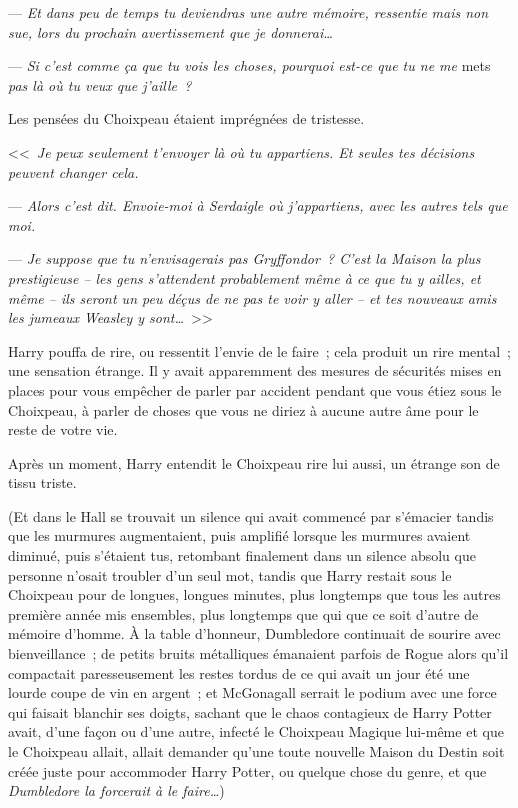 --- \emph{Et dans peu de temps tu deviendras une autre mémoire, ressentie mais non sue, lors du prochain avertissement que je donnerai…}

--- \emph{Si c'est comme ça que tu vois les choses, pourquoi est-ce que tu ne me} mets \emph{pas là où tu veux que j'aille~?}

Les pensées du Choixpeau étaient imprégnées de tristesse.

<<~\emph{Je peux seulement t'envoyer là où tu appartiens. Et seules tes décisions peuvent changer cela.}

--- \emph{Alors c'est dit. Envoie-moi à Serdaigle où j'appartiens, avec les autres tels que moi.}

--- \emph{Je suppose que tu n'envisagerais pas Gryffondor~? C'est la Maison la plus prestigieuse -- les gens s'attendent probablement même à ce que tu y ailles, et même -- ils seront un peu déçus de ne pas te voir y aller -- et tes nouveaux amis les jumeaux Weasley y sont…}~>>

Harry pouffa de rire, ou ressentit l'envie de le faire~; cela produit un rire mental~; une sensation étrange. Il y avait apparemment des mesures de sécurités mises en places pour vous empêcher de parler par accident pendant que vous étiez sous le Choixpeau, à parler de choses que vous ne diriez à aucune autre âme pour le reste de votre vie.

Après un moment, Harry entendit le Choixpeau rire lui aussi, un étrange son de tissu triste.

(Et dans le Hall se trouvait un silence qui avait commencé par s'émacier tandis que les murmures augmentaient, puis amplifié lorsque les murmures avaient diminué, puis s'étaient tus, retombant finalement dans un silence absolu que personne n'osait troubler d'un seul mot, tandis que Harry restait sous le Choixpeau pour de longues, longues minutes, plus longtemps que tous les autres première année mis ensembles, plus longtemps que qui que ce soit d'autre de mémoire d'homme. À la table d'honneur, Dumbledore continuait de sourire avec bienveillance~; de petits bruits métalliques émanaient parfois de Rogue alors qu'il compactait paresseusement les restes tordus de ce qui avait un jour été une lourde coupe de vin en argent~; et McGonagall serrait le podium avec une force qui faisait blanchir ses doigts, sachant que le chaos contagieux de Harry Potter avait, d'une façon ou d'une autre, infecté le Choixpeau Magique lui-même et que le Choixpeau allait, allait demander qu'une toute nouvelle Maison du Destin soit créée juste pour accommoder Harry Potter, ou quelque chose du genre, et que \emph{Dumbledore la forcerait à le faire…})

